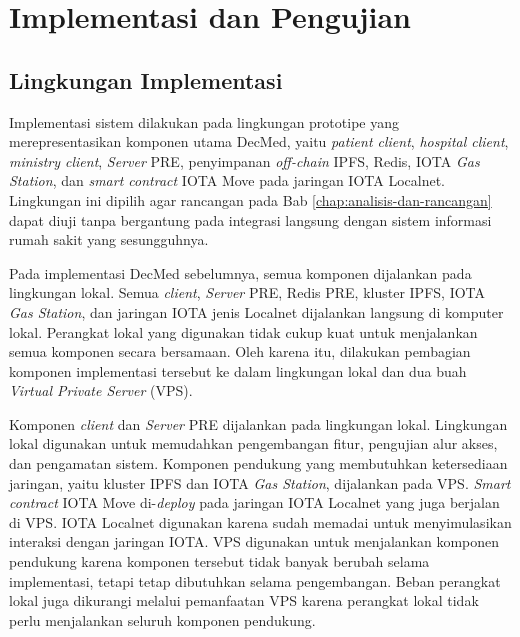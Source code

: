 \documentclass[bahasa, 12pt, a4paper, onecolumn, oneside, final]{report}
\begin{document}
\chapter{Implementasi dan Pengujian}
\label{bab:implementasi-dan-pengujian}

\section{Lingkungan Implementasi}
\label{sec:lingkungan-implementasi}

Implementasi sistem dilakukan pada lingkungan prototipe yang merepresentasikan komponen utama DecMed, yaitu \textit{patient client}, \textit{hospital client}, \textit{ministry client}, \textit{Server} PRE, penyimpanan \textit{off-chain} IPFS, Redis, IOTA \textit{Gas Station}, dan \textit{smart contract} IOTA Move pada jaringan IOTA Localnet. Lingkungan ini dipilih agar rancangan pada Bab \ref{chap:analisis-dan-rancangan} dapat diuji tanpa bergantung pada integrasi langsung dengan sistem informasi rumah sakit yang sesungguhnya.

Pada implementasi DecMed sebelumnya, semua komponen dijalankan pada lingkungan lokal. Semua \textit{client}, \textit{Server} PRE, Redis PRE, kluster IPFS, IOTA \textit{Gas Station}, dan jaringan IOTA jenis Localnet dijalankan langsung di komputer lokal. Perangkat lokal yang digunakan tidak cukup kuat untuk menjalankan semua komponen secara bersamaan. Oleh karena itu, dilakukan pembagian komponen implementasi tersebut ke dalam lingkungan lokal dan dua buah \textit{Virtual Private Server} (VPS).

Komponen \textit{client} dan \textit{Server} PRE dijalankan pada lingkungan lokal. Lingkungan lokal digunakan untuk memudahkan pengembangan fitur, pengujian alur akses, dan pengamatan sistem. Komponen pendukung yang membutuhkan ketersediaan jaringan, yaitu kluster IPFS dan IOTA \textit{Gas Station}, dijalankan pada VPS. \textit{Smart contract} IOTA Move di-\textit{deploy} pada jaringan IOTA Localnet yang juga berjalan di VPS. IOTA Localnet digunakan karena sudah memadai untuk menyimulasikan interaksi dengan jaringan IOTA. VPS digunakan untuk menjalankan komponen pendukung karena komponen tersebut tidak banyak berubah selama implementasi, tetapi tetap dibutuhkan selama pengembangan. Beban perangkat lokal juga dikurangi melalui pemanfaatan VPS karena perangkat lokal tidak perlu menjalankan seluruh komponen pendukung.
\end{document}
